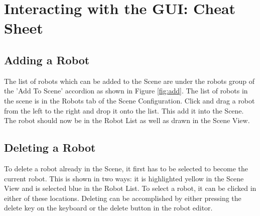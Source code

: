 \documentclass{article}
\begin{document}

%
%
\section{Interacting with the GUI: Cheat Sheet}
\subsection{Adding a Robot}
The list of robots which can be added to the Scene are under the robots group
of the 'Add To Scene' accordion as shown in Figure \ref{fig:add}.  The list of
robots in the scene is in the Robots tab of the Scene Configuration.  Click and
drag a robot from the left to the right and drop it onto the list.  This add it
into the Scene.  The robot should now be in the Robot List as well as drawn in
the Scene View.

\subsection{Deleting a Robot}
To delete a robot already in the Scene, it first has to be selected to become
the current robot.  This is shown in two ways: it is highlighted yellow in the
Scene View and is selected blue in the Robot List.  To select a robot, it can
be clicked in either of these locations.  Deleting can be accomplished by
either pressing the delete key on the keyboard or the delete button in the
robot editor.
\end{document}

